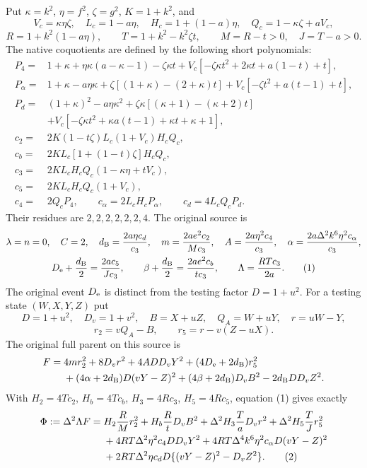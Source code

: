 Put $\kappa=k^2$, $\eta=f^2$, $\zeta=g^2$, $K=1+k^2$, and
\[
 V_c=\kappa\eta\zeta,\quad L_c=1-a\eta,\quad
 H_c=1+(1-a)\eta,\quad Q_c=1-\kappa\zeta+aV_c,
\]
\[
 R=1+k^2(1-a\eta),\qquad T=1+k^2-k^2\zeta t,
 \qquad M=R-t>0,\quad J=T-a>0.
\]
The native coquotients are defined by the following short polynomials:
\begin{align*}
 P_4={}&1+\kappa+\eta\kappa(a-\kappa-1)-\zeta\kappa t
 +V_c[-\zeta\kappa t^2+2\kappa t+a(1-t)+t],\\
 P_\alpha={}&1+\kappa-a\eta\kappa
 +\zeta[(1+\kappa)-(2+\kappa)t]
 +V_c[-\zeta t^2+a(t-1)+t],\\
 P_d={}&(1+\kappa)^2-a\eta\kappa^2
 +\zeta\kappa[(\kappa+1)-(\kappa+2)t]\\
 &+V_c[-\zeta\kappa t^2+\kappa a(t-1)+\kappa t+\kappa+1],\\
 c_2={}&2K(1-t\zeta)L_c(1+V_c)H_cQ_c,\\
 c_b={}&2KL_c[1+(1-t)\zeta]H_cQ_c,\\
 c_3={}&2KL_cH_cQ_c(1-\kappa\eta+tV_c),\\
 c_5={}&2KL_cH_cQ_c(1+V_c),\\
 c_4={}&2Q_cP_4,\qquad c_\alpha=2L_cH_cP_\alpha,
 \qquad c_d=4L_cQ_cP_d.
\end{align*}
Their residues are $2,2,2,2,2,2,4$. The original source is
\begin{gather}
 \lambda=n=0,\quad C=2,\quad
 d_{\rm B}=\frac{2a\eta c_d}{c_3},\quad
 m=\frac{2ae^2c_2}{Mc_3},\quad
 A=\frac{2a\eta^2c_4}{c_3},\quad
 \alpha=\frac{2a\Delta^2k^6\eta^2c_\alpha}{c_3},\notag\\
 D_{\rm e}+\frac{d_{\rm B}}2=\frac{2ac_5}{Jc_3},\qquad
 \beta+\frac{d_{\rm B}}2=\frac{2ae^2c_b}{tc_3},\qquad
 \Lambda=\frac{RTc_3}{2a}.                                      \tag{1}
\end{gather}
The original event $D_{\rm e}$ is distinct from the testing factor
$D=1+u^2$. For a testing state $(W,X,Y,Z)$ put
\[
 D=1+u^2,\quad D_v=1+v^2,\quad B=X+uZ,\quad Q_A=W+uY,
 \quad r=uW-Y,
\]
\[
 r_2=vQ_A-B,\qquad r_5=r-v(Z-uX).
\]
The original full parent on this source is
\begin{align*}
 F={}&4mr_2^2+8D_vr^2+4ADD_vY^2+(4D_{\rm e}+2d_{\rm B})r_5^2\\
 &+(4\alpha+2d_{\rm B})D(vY-Z)^2
 +(4\beta+2d_{\rm B})D_vB^2-2d_{\rm B}DD_vZ^2.
\end{align*}
With $H_2=4Tc_2$, $H_b=4Tc_b$, $H_3=4Rc_3$, $H_5=4Rc_5$,
equation (1) gives exactly
\begin{align}
 \Phi:=\Delta^2\Lambda F={}&H_2\frac RM r_2^2
 +H_b\frac RtD_vB^2+\Delta^2H_3\frac TaD_vr^2
 +\Delta^2H_5\frac TJr_5^2\notag\\
 &+4RT\Delta^2\eta^2c_4DD_vY^2
 +4RT\Delta^4k^6\eta^2c_\alpha D(vY-Z)^2\notag\\
 &+2RT\Delta^2\eta c_dD\{(vY-Z)^2-D_vZ^2\}.             \tag{2}
\end{align}

